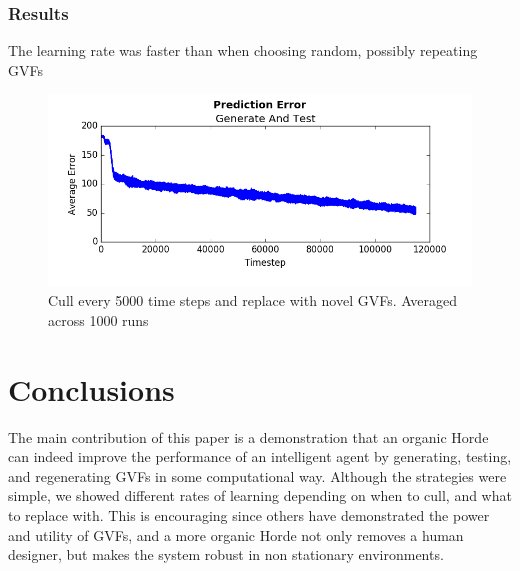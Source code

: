 \documentclass[letterpaper]{article}
\begin{document}
\subsubsection{Results}
The learning rate was faster than when choosing random, possibly repeating GVFs 

\begin{figure}[H]
  \centerline{\includegraphics[width = \linewidth]{Plots/AverageErrorKullEvery500011000Steps1000Runs.png}}
  \caption{Cull every 5000 time steps and replace with novel GVFs. Averaged across 1000 runs}
  \label{fig:experiment}
\end{figure}

\section{Conclusions}
The main contribution of this paper is a demonstration that an organic Horde can indeed improve the performance of an intelligent agent by generating, testing, and regenerating GVFs in some computational way. Although the strategies were simple, we showed different rates of learning depending on when to cull, and what to replace with. This is encouraging since others have demonstrated the power and utility of GVFs, and a more organic Horde not only removes a human designer, but makes the system robust in non stationary environments. 
\end{document}
